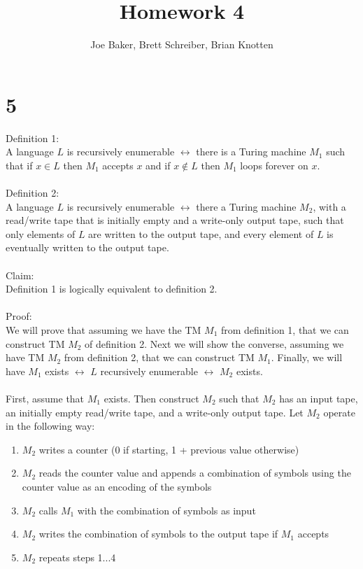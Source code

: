 \documentclass[letterpaper,notitlepage,twoside]{article}
\begin{document}
\title{Homework 4}
\author{Joe Baker, Brett Schreiber, Brian Knotten}
\maketitle

\section*{5}
Definition 1:
\\
A language $L$ is recursively enumerable $\leftrightarrow$ there is a Turing machine $M_1$ such that if $x \in L$ then $M_1$ accepts $x$ and if $x \notin L$ then $M_1$ loops forever on $x$.
\\
\\
Definition 2:
\\
A language $L$ is recursively enumerable $\leftrightarrow$ there a Turing machine $M_2$, with a read/write tape that is initially empty and a write-only output tape, such that only elements of $L$ are written to the output tape, and every element of $L$ is eventually written to the output tape.
\\
\\
Claim:
\\
Definition 1 is logically equivalent to definition 2.
\\
\\
Proof:
\\
We will prove that assuming we have the TM $M_1$ from definition 1, that we can construct TM $M_2$ of definition 2. Next we will show the converse, assuming we have TM $M_2$ from definition 2, that we can construct TM $M_1$. Finally, we will have $M_1$ exists $\leftrightarrow$ $L$ recursively enumerable $\leftrightarrow$ $M_2$ exists.
\\
\\
First, assume that $M_1$ exists. Then construct $M_2$ such that $M_2$ has an input tape, an initially empty read/write tape, and a write-only output tape. Let $M_2$ operate in the following way:
\begin{enumerate}
\item $M_2$ writes a counter (0 if starting, 1 + previous value otherwise)
\item $M_2$ reads the counter value and appends a combination of symbols using the counter value as an encoding of the symbols
\item $M_2$ calls $M_1$ with the combination of symbols as input
\item $M_2$ writes the combination of symbols to the output tape if $M_1$ accepts
\item $M_2$ repeats steps 1...4
\end{enumerate}
\end{document}
